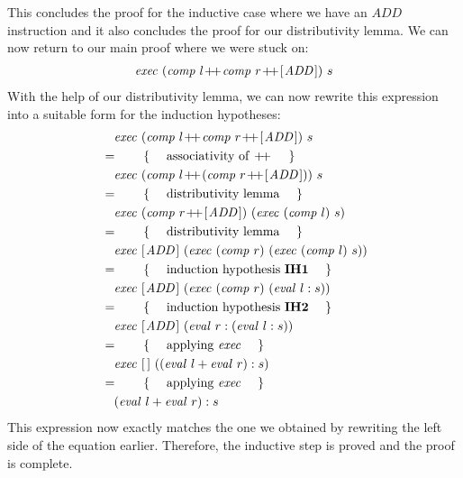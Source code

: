 This concludes the proof for the inductive case where we have an $\mathit{ADD}$ instruction and it also concludes the proof for our distributivity lemma. We can now return to our main proof where we were stuck on:
\begin{align*}
\lastexpr{\mathit{exec}~(\mathit{comp}~l \append \mathit{comp}~r \append \hslist{\mathit{ADD}})~s}
\end{align*}
With the help of our distributivity lemma, we can now rewrite this expression into a suitable form for the induction hypotheses:
\begin{align*}
\expr{\mathit{exec}~(\mathit{comp}~l \append \mathit{comp}~r \append \hslist{\mathit{ADD}})~s}
\hint{associativity of $\append$}
\expr{\mathit{exec}~(\mathit{comp}~l \append (\mathit{comp}~r \append \hslist{\mathit{ADD}}))~s}
\hint{distributivity lemma}
\expr{\mathit{exec}~(\mathit{comp}~r \append \hslist{\mathit{ADD}})~(\mathit{exec}~(\mathit{comp}~l)~s)}
\hint{distributivity lemma}
\expr{\mathit{exec}~\hslist{\mathit{ADD}}~(\mathit{exec}~(\mathit{comp}~r)~(\mathit{exec}~(\mathit{comp}~l)~s))}
\hint{induction hypothesis $\mathbf{IH1}$}
\expr{\mathit{exec}~\hslist{\mathit{ADD}}~(\mathit{exec}~(\mathit{comp}~r)~(\mathit{eval}~l : s))}
\hint{induction hypothesis $\mathbf{IH2}$}
\expr{\mathit{exec}~\hslist{\mathit{ADD}}~(\mathit{eval}~r : (\mathit{eval}~l : s))}
\hint{applying $\mathit{exec}$}
\expr{\mathit{exec}~\hslist{}~((\mathit{eval}~l + \mathit{eval}~r) : s)}
\hint{applying $\mathit{exec}$}
\lastexpr{(\mathit{eval}~l + \mathit{eval}~r) : s}
\end{align*}
This expression now exactly matches the one we obtained by rewriting the left side of the equation earlier. Therefore, the inductive step is proved and the proof is complete.